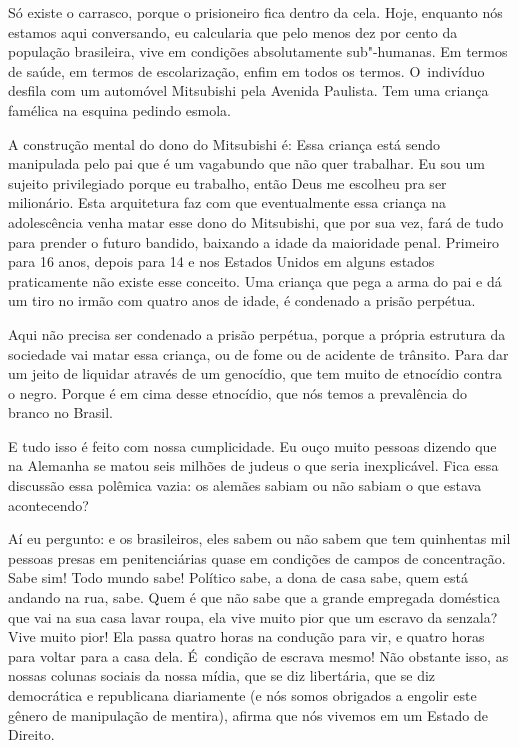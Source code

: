 

Só existe o carrasco, porque o prisioneiro fica dentro da cela. Hoje,
enquanto nós estamos aqui conversando, eu calcularia que pelo menos dez
por cento da população brasileira, vive em condições absolutamente
sub"-humanas. Em termos de saúde, em termos de escolarização, enfim em
todos os termos. O~indivíduo desfila com um automóvel Mitsubishi pela
Avenida Paulista. Tem uma criança famélica na esquina pedindo esmola.

 

A construção mental do dono do Mitsubishi é: Essa criança está sendo
manipulada pelo pai que é um vagabundo que não quer trabalhar. Eu sou um
sujeito privilegiado porque eu trabalho, então Deus me escolheu pra ser
milionário. Esta arquitetura faz com que eventualmente essa criança na
adolescência venha matar esse dono do Mitsubishi, que por sua vez, fará
de tudo para prender o futuro bandido, baixando a idade da maioridade
penal. Primeiro para 16 anos, depois para 14 e nos Estados Unidos em
alguns estados praticamente não existe esse conceito. Uma criança que
pega a arma do pai e dá um tiro no irmão com quatro anos de idade, é
condenado a prisão perpétua.

 

Aqui não precisa ser condenado a prisão perpétua, porque a própria
estrutura da sociedade vai matar essa criança, ou de fome ou de acidente
de trânsito. Para dar um jeito de liquidar através de um genocídio, que
tem muito de etnocídio contra o negro. Porque é em cima desse etnocídio,
que nós temos a prevalência do branco no Brasil.

 

E tudo isso é feito com nossa cumplicidade. Eu ouço muito pessoas
dizendo que na Alemanha se matou seis milhões de judeus o que seria
inexplicável. Fica essa discussão essa polêmica vazia: os alemães sabiam
ou não sabiam o que estava acontecendo?

 

Aí eu pergunto: e os brasileiros, eles sabem ou não sabem que tem
quinhentas mil pessoas presas em penitenciárias quase em condições de
campos de concentração. Sabe sim! Todo mundo sabe! Político sabe, a dona
de casa sabe, quem está andando na rua, sabe. Quem é que não sabe que a
grande empregada doméstica que vai na sua casa lavar roupa, ela vive
muito pior que um escravo da senzala? Vive muito pior! Ela passa quatro
horas na condução para vir, e quatro horas para voltar para a casa dela.
É~condição de escrava mesmo! Não obstante isso, as nossas colunas
sociais da nossa mídia, que se diz libertária, que se diz democrática e
republicana diariamente (e nós somos obrigados a engolir este gênero de
manipulação de mentira), afirma que nós vivemos em um Estado de Direito.

